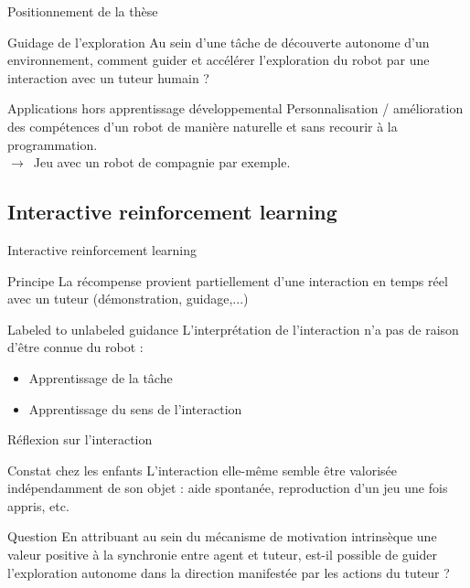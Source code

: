 \documentclass[xcolor=pst,dvips,12pt,english,french]{beamer}
\begin{document}
	\begin{frame}{Positionnement de la thèse}
		\begin{block}{Guidage de l'exploration}
			Au sein d'une tâche de découverte autonome d'un environnement, comment guider et accélérer l'exploration du robot par une interaction avec un tuteur humain ?
		\end{block}
		\begin{exampleblock}{Applications hors apprentissage développemental}
			Personnalisation / amélioration des compétences d'un robot de manière naturelle et sans recourir à la programmation.
			 \\ 
			$\to\,$ Jeu avec un robot de compagnie par exemple.
		\end{exampleblock}
	\end{frame}
	
	\subsection{Interactive reinforcement learning}
	
	\begin{frame}{Interactive reinforcement learning}
		\begin{block}{Principe}
			La récompense provient partiellement d'une interaction en temps réel avec un tuteur (démonstration, guidage,...)
		\end{block}
		\begin{exampleblock}{Labeled to unlabeled guidance}
			L'interprétation de l'interaction n'a pas de raison d'être connue du robot :
			\begin{itemize}
				\item Apprentissage de la tâche 
				\item Apprentissage du sens de l'interaction
			\end{itemize}
		\end{exampleblock}
	\end{frame}
	
	\begin{frame}{Réflexion sur l'interaction}
		\begin{block}{Constat chez les enfants}
			L'interaction elle-même semble être valorisée indépendamment de son objet : aide spontanée, reproduction d'un jeu une fois appris, etc.
		\end{block}
		\begin{exampleblock}{Question}
			En attribuant au sein du mécanisme de motivation intrinsèque une valeur positive à la synchronie entre agent et tuteur, est-il possible de guider l'exploration autonome dans la direction manifestée par les actions du tuteur ? 
		\end{exampleblock}
	\end{frame}
	
\end{document}
